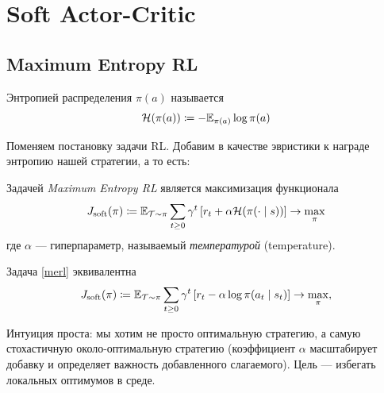 \section{Soft Actor-Critic}\label{SACsection}

\subsection{Maximum Entropy RL}\label{maximumentropyrlsubsection}

\begin{definition}
Энтропией распределения $\pi(a)$ называется
$$\mathcal{H}(\pi(a)) \coloneqq - \mathbb{E}_{\pi(a)} \log \pi(a)$$
\end{definition}

Поменяем постановку задачи RL. Добавим в качестве эвристики к награде энтропию нашей стратегии, а то есть:

\begin{definition}
Задачей \emph{Maximum Entropy RL} является максимизация функционала
\begin{equation}\label{merl}
    J_{\mathrm{soft}}(\pi) \coloneqq \mathbb{E}_{\mathcal{T} \sim \pi} \sum_{t \ge 0} \gamma^t \left[ r_t + \alpha \mathcal{H}(\pi(\cdot \mid s)) \right] \to \max_\pi
\end{equation}
где $\alpha$ --- гиперпараметр, называемый \emph{температурой} (temperature).
\end{definition}

\begin{proposition}
Задача \eqref{merl} эквивалентна
\begin{equation*}
    J_{\mathrm{soft}}(\pi) \coloneqq \mathbb{E}_{\mathcal{T} \sim \pi} \sum_{t \ge 0} \gamma^t \left[ r_t - \alpha \log \pi(a_t \mid s_t) \right] \to \max_\pi,
\end{equation*}
\end{proposition}

Интуиция проста: мы хотим не просто оптимальную стратегию, а самую стохастичную около-оптимальную стратегию (коэффициент $\alpha$ масштабирует добавку и определяет важность добавленного слагаемого). Цель --- избегать локальных оптимумов в среде. 

